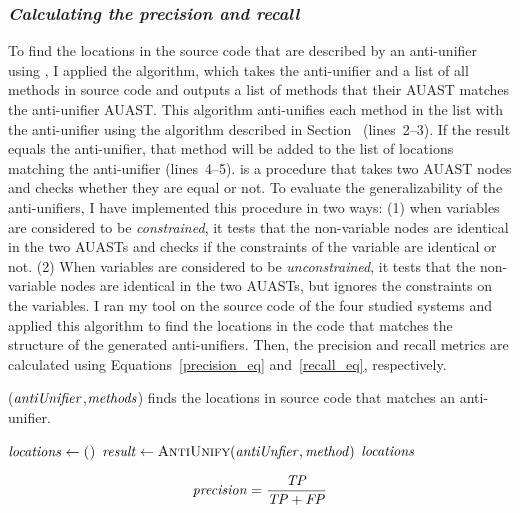 \subsubsection{\emph{Calculating the precision and recall}}  \label{precision}
To find the locations in the source code that are described by an anti-unifier using , I applied the  algorithm, which takes the anti-unifier and a list of all methods in source code and outputs a list of methods that their AUAST matches the anti-unifier AUAST. This algorithm anti-unifies each method in the list with the anti-unifier using the  algorithm described in Section~\label{meth-antiUnifier} (lines~2--3). If the result equals the anti-unifier, that method will be added to the list of locations matching the anti-unifier (lines~4--5).  is a procedure that takes two AUAST nodes and checks whether they are equal or not. To evaluate the generalizability of the anti-unifiers, I have implemented this procedure in two ways: (1) when variables are considered to be \emph{constrained}, it tests that the non-variable nodes are identical in the two AUASTs and checks if the constraints of the variable are identical or not. (2) When variables are considered to be \emph{unconstrained}, it tests that the non-variable nodes are identical in the two AUASTs, but ignores the constraints on the variables. I ran my tool on the source code of the four studied systems and applied this algorithm to find the locations in the code that matches the structure of the generated anti-unifiers. Then, the precision and recall metrics are calculated using Equations~\ref{precision_eq} and~\ref{recall_eq}, respectively.


\begin{algorithm}
\caption{($\mathit{antiUnifier}$,$\mathit{methods}$) finds the locations in source code that matches an anti-unifier.}
\label{alg-determine}
\begin{algorithmic}[1]
\DetermineLocations
    \State $\mathit{locations} \gets \textsc{()}$
    \State $\mathit{result} \gets  \textsc{AntiUnify}(\mathit{antiUnfier},\mathit{method})$
		\EndIf 		
		\EndFor
 \Return $\mathit{locations} $  	
  \end{algorithmic}
\end{algorithm}

\begin{equation}\label{precision_eq}
\mathit{precision} = \frac{\mathit{TP}}{{\mathit{TP}+\mathit{FP}}}
\end{equation}


